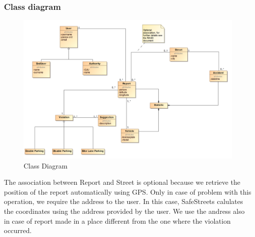 \subsubsection{Class diagram}
\begin{figure}[H]
	\centering
	\includegraphics[width=1.12\linewidth]{Images/ClassDiagram.png}
	\caption{Class Diagram}
\end{figure}
The association between Report and Street is optional because we retrieve the position of the report automatically using GPS. Only in case of problem with this operation, we require the address to the user. In this case, SafeStreets calulates the coordinates using the address provided by the user. We use the andress also in case of report made in a place different from the one where the violation occurred. 
